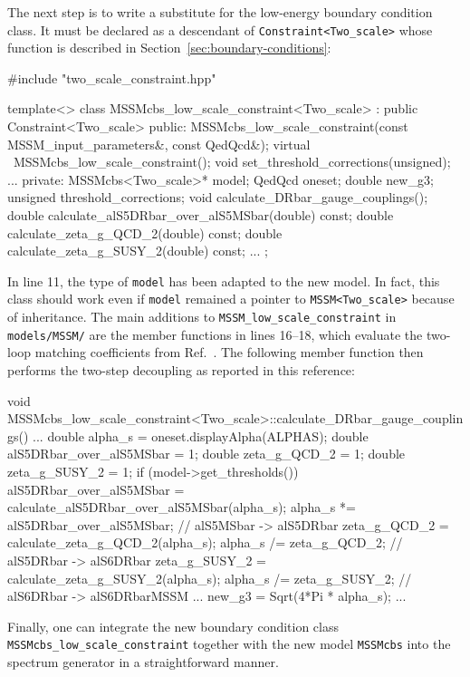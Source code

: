 \documentclass[final,3p,11pt,pdflatex]{elsarticle}
\newcommand{\code}[1]{\lstinline|#1|}  %
\newcommand{\secref}[1]{Section~\ref{#1}}
\begin{document}
The next step is to write a substitute for
the low-energy boundary condition class.
It must be declared as a descendant of \code{Constraint<Two_scale>}
whose function is described in \secref{sec:boundary-conditions}:
\begin{numlstlisting}
#include "two_scale_constraint.hpp"

template<>
class MSSMcbs_low_scale_constraint<Two_scale> : public Constraint<Two_scale> {
public:
  MSSMcbs_low_scale_constraint(const MSSM_input_parameters&, const QedQcd&);
  virtual ~MSSMcbs_low_scale_constraint();
  void set_threshold_corrections(unsigned);
  ...
private:
  MSSMcbs<Two_scale>* model;
  QedQcd oneset;
  double new_g3;
  unsigned threshold_corrections;
  void calculate_DRbar_gauge_couplings();
  double calculate_alS5DRbar_over_alS5MSbar(double) const;
  double calculate_zeta_g_QCD_2(double) const;
  double calculate_zeta_g_SUSY_2(double) const;
  ...
};
\end{numlstlisting}
In line 11,
the type of \code{model} has been adapted to the new model.
In fact, this class should work even if \code{model} remained
a pointer to \code{MSSM<Two_scale>} because of inheritance.
The main additions to \code{MSSM_low_scale_constraint}
in \code{models/MSSM/} are the member functions in lines 16--18,
which evaluate the two-loop matching coefficients
from Ref.~\cite{Harlander:2005wm}.
The following member function then performs
the two-step decoupling as reported in this reference:
\begin{numlstlisting}[language=C++]
void MSSMcbs_low_scale_constraint<Two_scale>::calculate_DRbar_gauge_couplings()
{
  ...
  double alpha_s = oneset.displayAlpha(ALPHAS);
  double alS5DRbar_over_alS5MSbar = 1;
  double zeta_g_QCD_2 = 1;
  double zeta_g_SUSY_2 = 1;
  if (model->get_thresholds()) {
    alS5DRbar_over_alS5MSbar = calculate_alS5DRbar_over_alS5MSbar(alpha_s);
    alpha_s *= alS5DRbar_over_alS5MSbar;  // alS5MSbar -> alS5DRbar
    zeta_g_QCD_2 = calculate_zeta_g_QCD_2(alpha_s);
    alpha_s /= zeta_g_QCD_2;		  // alS5DRbar -> alS6DRbar
    zeta_g_SUSY_2 = calculate_zeta_g_SUSY_2(alpha_s);
    alpha_s /= zeta_g_SUSY_2;		  // alS6DRbar -> alS6DRbarMSSM
    ...
  }
  new_g3 = Sqrt(4*Pi * alpha_s);
  ...
}
\end{numlstlisting}
Finally,
one can integrate the new boundary condition class
\code{MSSMcbs_low_scale_constraint} together with
the new model \code{MSSMcbs}
into the spectrum generator in a straightforward manner.
\end{document}
